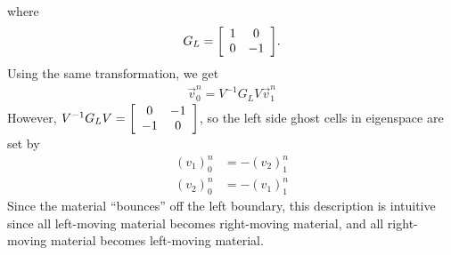 \documentclass{article} %
\theoremstyle{plain}
\numberwithin{equation}{section} %
\numberwithin{figure}{section} %
\numberwithin{table}{section} %
\begin{document}
\begin{enumerate}[\ \ (a)]
\begin{align*}
        \end{align*}
        where
        \begin{align*}
            G_L = \qty[\begin{array}{cc} 1 & 0 \\ 0 & -1 \end{array}].
        \end{align*}
        Using the same transformation, we get
        \begin{align*}
            \vec{v}_0^n = V^{-1}G_LV\vec{v}_1^n
        \end{align*}
        However, $V^{-1}G_LV = \qty[\begin{array}{cc}0 & -1 \\ -1 & 0\end{array}]$, so the left side ghost cells in eigenspace are set by
        \begin{align*}
            (v_1)_0^n &= -(v_2)_1^n \\
            (v_2)_0^n &= -(v_1)_1^n
        \end{align*}
        Since the material ``bounces'' off the left boundary, this description is intuitive since all left-moving material becomes right-moving material, and all right-moving material becomes left-moving material.
        
\end{enumerate}
\end{document}
